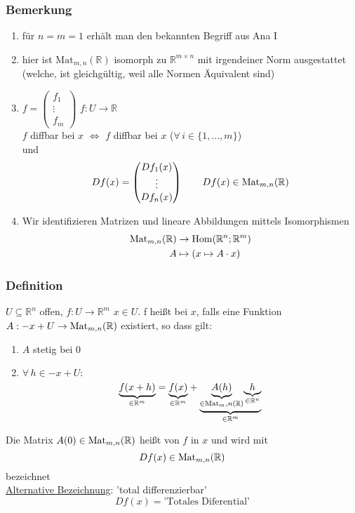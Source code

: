\subsubsection{Bemerkung} %
\label{ssub:bemerkung}
\begin{enumerate}
	\item für $n=m=1$ erhält man den bekannten Begriff aus Ana I 
	\item hier ist $\text{Mat}_{m,n}(\mathbb{R})$ isomorph zu $\mathbb{R}^{m \times n}$ mit irgendeiner Norm ausgestattet (welche, ist gleichgültig, weil alle Normen
	Äquivalent sind)
	\item $f= \begin{pmatrix}
		f_1 \\ \vdots \\ f_m
	\end{pmatrix}$ $f: U \to \mathbb{R}$ \\
	$f$ diffbar bei $x$ $\Leftrightarrow$ $f$ diffbar bei $x$ ($\forall\, i \in \{1,\dots,m\}$) \\
	und
	\[
		Df(x)= \begin{pmatrix}
			Df_1(x) \\
			\vdots \\
			Df_n(x)
		\end{pmatrix} \qquad Df(x) \in \operatorname{Mat}_{m,n}(\mathbb{R})
	\]
	\item Wir identifizieren Matrizen und lineare Abbildungen mittels Isomorphismen
	\begin{align*}
		\operatorname{Mat}_{m,n}(\mathbb{R}) &\rightarrow \operatorname{Hom}(\mathbb{R}^n;\mathbb{R}^m) \\
		 A &\mapsto (x \mapsto A \cdot x)
	\end{align*}
\end{enumerate}
\subsubsection{Definition} %
\label{ssub:definition}
$U \subseteq \mathbb{R}^n$ offen, $f:U \to \mathbb{R}^m$ $x \in U$. f heißt  bei $x$, falls eine Funktion $A: -x+U \to \operatorname{Mat}_{m,n}(\mathbb{R})$ existiert, so dass gilt:
\begin{enumerate}
	\item $A$ stetig bei 0
	\item $\forall\, h \in -x+U:$
	\[
		\underset{\in \mathbb{R}^m}{\underbrace{f(x+h)}} = \underset{\in \mathbb{R}^m}{\underbrace{f(x)}} + \underset{\in \mathbb{R}^m}{\underbrace{\underset{
		\in \operatorname{Mat}_m,n(\mathbb{R})}{\underbrace{A(h)}}
		\underset{\in \mathbb{R}^n}{\underbrace{h}}}}
	\]
\end{enumerate}
Die Matrix $A(0) \in \operatorname{Mat}_{m,n}(\mathbb{R})$ heißt  von $f$ in $x$ und wird mit
\[
	Df(x) \in \operatorname{Mat}_{m,n}(\mathbb{R})
\]
bezeichnet \\
\underline{Alternative Bezeichnung}:
'total differenzierbar' \\
\[
	Df(x)=\text{'Totales Diferential'}
\]
